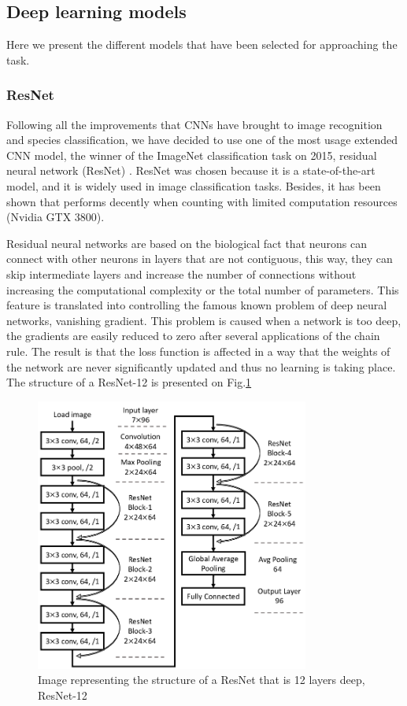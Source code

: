 \documentclass{article}
\begin{document}
\subsection{Deep learning models}

Here we present the different models that have been selected for approaching the task.

\subsubsection{ResNet}

Following all the improvements that CNNs have brought to image recognition and species classification, we have decided to use one of the most usage extended CNN model, the winner of the ImageNet \cite{Imagenet} classification task on 2015, residual neural network (ResNet) \cite{resnet}. ResNet was chosen because it is a state-of-the-art model, and it is widely used in image classification tasks. Besides, it has been shown that performs decently when counting with limited computation resources (Nvidia GTX 3800).

Residual neural networks are based on the biological fact that neurons can connect with other neurons in layers that are not contiguous, this way, they can skip intermediate layers and increase the number of connections without increasing the computational complexity or the total number of parameters. This feature is translated into controlling the famous known problem of deep neural networks, vanishing gradient. This problem is caused when a network is too deep, the gradients are easily reduced to zero after several applications of the chain rule. The result is that the loss function is affected in a way that the weights of the network are never significantly updated and thus no learning is taking place. The structure of a ResNet-12 is presented on Fig.\ref{fig:resnet}

\begin{figure}[h]
    \centering
    \includegraphics[width=9cm]{resnet12}
    \caption{Image representing the structure of a ResNet that is 12 layers deep, ResNet-12 \cite{resnet12}}
    \label{fig:resnet}

\end{figure}
\end{document}
